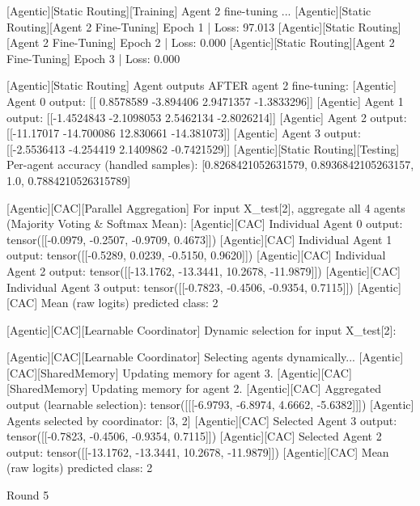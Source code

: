 [Agentic][Static Routing][Training] Agent 2 fine-tuning ...
[Agentic][Static Routing][Agent 2 Fine-Tuning] Epoch 1 | Loss: 97.013
[Agentic][Static Routing][Agent 2 Fine-Tuning] Epoch 2 | Loss: 0.000
[Agentic][Static Routing][Agent 2 Fine-Tuning] Epoch 3 | Loss: 0.000

[Agentic][Static Routing] Agent outputs AFTER agent 2 fine-tuning:
[Agentic] Agent 0 output: [[ 0.8578589 -3.894406   2.9471357 -1.3833296]]
[Agentic] Agent 1 output: [[-1.4524843 -2.1098053  2.5462134 -2.8026214]]
[Agentic] Agent 2 output: [[-11.17017  -14.700086  12.830661 -14.381073]]
[Agentic] Agent 3 output: [[-2.5536413 -4.254419   2.1409862 -0.7421529]]
[Agentic][Static Routing][Testing] Per-agent accuracy (handled samples): [0.8268421052631579, 0.8936842105263157, 1.0, 0.7884210526315789]

[Agentic][CAC][Parallel Aggregation] For input X_test[2], aggregate all 4 agents (Majority Voting & Softmax Mean):
[Agentic][CAC] Individual Agent 0 output: tensor([[-0.0979, -0.2507, -0.9709,  0.4673]])
[Agentic][CAC] Individual Agent 1 output: tensor([[-0.5289,  0.0239, -0.5150,  0.9620]])
[Agentic][CAC] Individual Agent 2 output: tensor([[-13.1762, -13.3441,  10.2678, -11.9879]])
[Agentic][CAC] Individual Agent 3 output: tensor([[-0.7823, -0.4506, -0.9354,  0.7115]])
[Agentic][CAC] Mean (raw logits) predicted class: 2

[Agentic][CAC][Learnable Coordinator] Dynamic selection for input X_test[2]:

[Agentic][CAC][Learnable Coordinator] Selecting agents dynamically...
[Agentic][CAC][SharedMemory] Updating memory for agent 3.
[Agentic][CAC][SharedMemory] Updating memory for agent 2.
[Agentic][CAC] Aggregated output (learnable selection): tensor([[[-6.9793, -6.8974,  4.6662, -5.6382]]])
[Agentic] Agents selected by coordinator: [3, 2]
[Agentic][CAC] Selected Agent 3 output: tensor([[-0.7823, -0.4506, -0.9354,  0.7115]])
[Agentic][CAC] Selected Agent 2 output: tensor([[-13.1762, -13.3441,  10.2678, -11.9879]])
[Agentic][CAC] Mean (raw logits) predicted class: 2

Round 5

